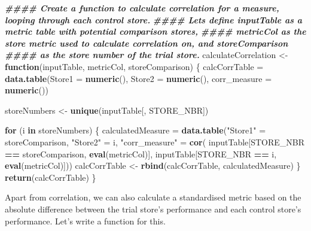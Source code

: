 \documentclass[
]{article}
\newenvironment{Shaded}{\begin{snugshade}}{\end{snugshade}}
\newcommand{\AttributeTok}[1]{\textcolor[rgb]{0.13,0.29,0.53}{#1}}
\newcommand{\ControlFlowTok}[1]{\textcolor[rgb]{0.13,0.29,0.53}{\textbf{#1}}}
\newcommand{\DocumentationTok}[1]{\textcolor[rgb]{0.56,0.35,0.01}{\textbf{\textit{#1}}}}
\newcommand{\FunctionTok}[1]{\textcolor[rgb]{0.13,0.29,0.53}{\textbf{#1}}}
\newcommand{\NormalTok}[1]{#1}
\newcommand{\OtherTok}[1]{\textcolor[rgb]{0.56,0.35,0.01}{#1}}
\newcommand{\SpecialCharTok}[1]{\textcolor[rgb]{0.81,0.36,0.00}{\textbf{#1}}}
\newcommand{\StringTok}[1]{\textcolor[rgb]{0.31,0.60,0.02}{#1}}
\begin{document}
\begin{Shaded}
\begin{Highlighting}[]
\DocumentationTok{\#\#\#\# Create a function to calculate correlation for a measure, looping through each control store.}
\DocumentationTok{\#\#\#\# Let\textquotesingle{}s define inputTable as a metric table with potential comparison stores, }
\DocumentationTok{\#\#\#\# metricCol as the store metric used to calculate correlation on, and storeComparison}
\DocumentationTok{\#\#\#\# as the store number of the trial store.}
\NormalTok{calculateCorrelation }\OtherTok{\textless{}{-}} \ControlFlowTok{function}\NormalTok{(inputTable, metricCol, storeComparison) \{}
\NormalTok{  calcCorrTable }\OtherTok{=} \FunctionTok{data.table}\NormalTok{(}\AttributeTok{Store1 =} \FunctionTok{numeric}\NormalTok{(), }\AttributeTok{Store2 =} \FunctionTok{numeric}\NormalTok{(), }\AttributeTok{corr\_measure =}
  \FunctionTok{numeric}\NormalTok{())}

\NormalTok{  storeNumbers }\OtherTok{\textless{}{-}} \FunctionTok{unique}\NormalTok{(inputTable[, STORE\_NBR])}
  
  \ControlFlowTok{for}\NormalTok{ (i }\ControlFlowTok{in}\NormalTok{ storeNumbers) \{}
\NormalTok{    calculatedMeasure }\OtherTok{=} \FunctionTok{data.table}\NormalTok{(}\StringTok{"Store1"} \OtherTok{=}\NormalTok{ storeComparison,}
                                   \StringTok{"Store2"} \OtherTok{=}\NormalTok{ i,}
                                   \StringTok{"corr\_measure"} \OtherTok{=} \FunctionTok{cor}\NormalTok{( inputTable[STORE\_NBR }\SpecialCharTok{==}\NormalTok{ storeComparison,}
                                                                     \FunctionTok{eval}\NormalTok{(metricCol)], inputTable[STORE\_NBR }\SpecialCharTok{==}\NormalTok{ i,}
                                                                                                \FunctionTok{eval}\NormalTok{(metricCol)]))}
\NormalTok{    calcCorrTable }\OtherTok{\textless{}{-}} \FunctionTok{rbind}\NormalTok{(calcCorrTable, calculatedMeasure)}
\NormalTok{  \}}
  \FunctionTok{return}\NormalTok{(calcCorrTable)}
\NormalTok{\}}
\end{Highlighting}
\end{Shaded}

Apart from correlation, we can also calculate a standardised metric
based on the absolute difference between the trial store's performance
and each control store's performance. Let's write a function for this.
\end{document}

